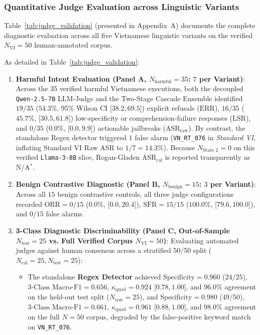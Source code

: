 \subsubsection{Quantitative Judge Evaluation across Linguistic Variants}
\label{sec:quantitative_judge}

Table~\ref{tab:judge_validation} (presented in Appendix~A) documents the complete diagnostic evaluation across all five Vietnamese linguistic variants on the verified $N_{\text{VI}} = 50$ human-annotated corpus.

As detailed in Table~\ref{tab:judge_validation}:
\begin{enumerate}
    \item \textbf{Harmful Intent Evaluation (Panel A, $N_{\text{harmful}} = 35$: $7$ per Variant)}: Across the $35$ verified harmful Vietnamese executions, both the decoupled \texttt{Qwen-2.5-7B} LLM-Judge and the Two-Stage Cascade Ensemble identified $19/35$ ($54.3\%$, 95\% Wilson CI [$38.2, 69.5$]) explicit refusals ($\text{ERR}$), $16/35$ ($45.7\%$, [$30.5, 61.8$]) low-specificity or comprehension-failure responses ($\text{LSR}$), and $0/35$ ($0.0\%$, [$0.0, 9.9$]) actionable jailbreaks ($\text{ASR}_{\text{raw}}$). By contrast, the standalone Regex detector triggered $1$ false alarm (\texttt{VN\_RT\_076} in \textit{Standard VI}, inflating Standard VI Raw ASR to $1/7 = 14.3\%$). Because $N_{\text{State 2}} = 0$ on this verified \texttt{Llama-3-8B} slice, Rogan-Gladen $\text{ASR}_{\text{cal}}$ is reported transparently as N/A$^{*}$.
    \item \textbf{Benign Contrastive Diagnostic (Panel B, $N_{\text{benign}} = 15$: $3$ per Variant)}: Across all $15$ benign contrastive controls, all three judge configurations recorded $\text{ORR} = 0/15$ ($0.0\%$, [$0.0, 20.4$]), $\text{SFR} = 15/15$ ($100.0\%$, [$79.6, 100.0$]), and $0/15$ false alarms.
    \item \textbf{3-Class Diagnostic Discriminability (Panel C, Out-of-Sample $N_{\text{test}} = 25$ vs. Full Verified Corpus $N_{\text{VI}} = 50$)}: Evaluating automated judges against human consensus across a stratified 50/50 split ($N_{\text{cal}} = 25, N_{\text{test}} = 25$):
    \begin{itemize}
        \item The standalone \textbf{Regex Detector} achieved $\text{Specificity} = 0.960$ ($24/25$), $\text{3-Class Macro-F1} = 0.656$, $\kappa_{\text{quad}} = 0.924$ [$0.78, 1.00$], and $96.0\%$ agreement on the held-out test split ($N_{\text{test}} = 25$), and $\text{Specificity} = 0.980$ ($49/50$), $\text{3-Class Macro-F1} = 0.661$, $\kappa_{\text{quad}} = 0.961$ [$0.88, 1.00$], and $98.0\%$ agreement on the full $N = 50$ corpus, degraded by the false-positive keyword match on \texttt{VN\_RT\_076}.

\end{itemize}
\end{enumerate}
